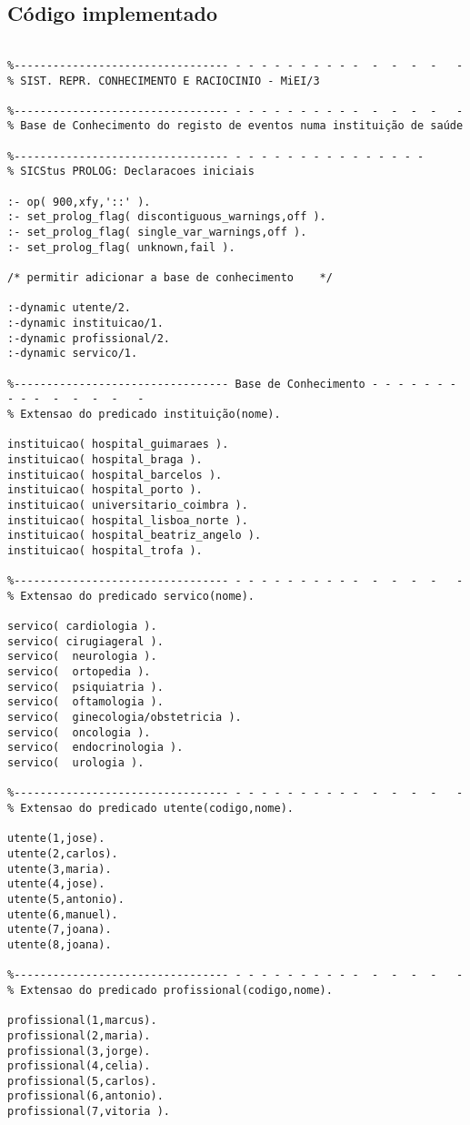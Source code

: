 \documentclass[pdftex,12pt,a4paper]{report}
\begin{document}


\tableofcontents
\listoffigures 





\begin{appendices}
	\chapter{Código implementado}
\begin{Verbatim}

%--------------------------------- - - - - - - - - - -  -  -  -  -   -
% SIST. REPR. CONHECIMENTO E RACIOCINIO - MiEI/3

%--------------------------------- - - - - - - - - - -  -  -  -  -   -
% Base de Conhecimento do registo de eventos numa instituição de saúde

%--------------------------------- - - - - - - - - - - - - - - -
% SICStus PROLOG: Declaracoes iniciais

:- op( 900,xfy,'::' ).
:- set_prolog_flag( discontiguous_warnings,off ).
:- set_prolog_flag( single_var_warnings,off ).
:- set_prolog_flag( unknown,fail ).

/* permitir adicionar a base de conhecimento	*/

:-dynamic utente/2.
:-dynamic instituicao/1.
:-dynamic profissional/2.
:-dynamic servico/1.

%--------------------------------- Base de Conhecimento - - - - - - - - - -  -  -  -  -   -
% Extensao do predicado instituição(nome). 

instituicao( hospital_guimaraes ). 
instituicao( hospital_braga ).
instituicao( hospital_barcelos ).
instituicao( hospital_porto ).
instituicao( universitario_coimbra ).
instituicao( hospital_lisboa_norte ).
instituicao( hospital_beatriz_angelo ).
instituicao( hospital_trofa ).

%--------------------------------- - - - - - - - - - -  -  -  -  -   -
% Extensao do predicado servico(nome).

servico( cardiologia ). 
servico( cirugiageral ).
servico(  neurologia ).
servico(  ortopedia ).
servico(  psiquiatria ).
servico(  oftamologia ).
servico(  ginecologia/obstetricia ).
servico(  oncologia ).
servico(  endocrinologia ).
servico(  urologia ).  

%--------------------------------- - - - - - - - - - -  -  -  -  -   -
% Extensao do predicado utente(codigo,nome).

utente(1,jose).  
utente(2,carlos). 
utente(3,maria). 
utente(4,jose).   
utente(5,antonio). 
utente(6,manuel).  
utente(7,joana).
utente(8,joana).  

%--------------------------------- - - - - - - - - - -  -  -  -  -   -
% Extensao do predicado profissional(codigo,nome).

profissional(1,marcus).
profissional(2,maria).
profissional(3,jorge).
profissional(4,celia).
profissional(5,carlos).
profissional(6,antonio).
profissional(7,vitoria ).



\end{Verbatim}

\end{appendices}
\end{document}
